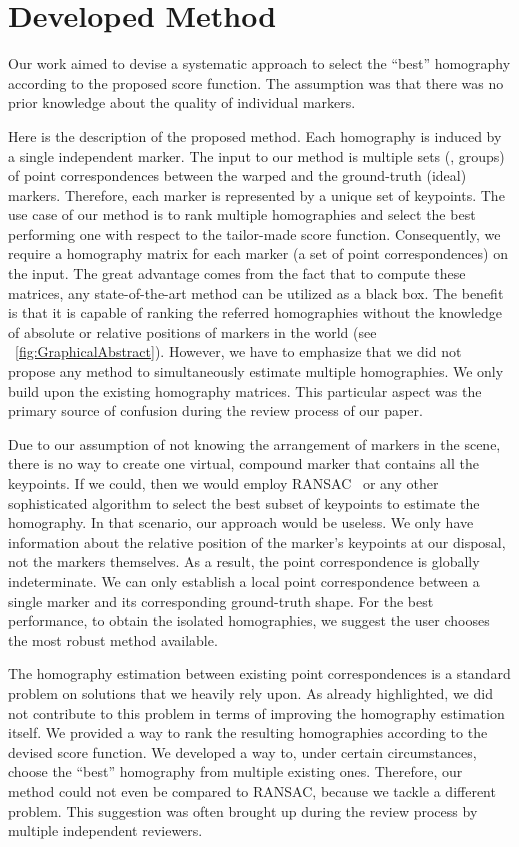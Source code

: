 \section{Developed Method}
\label{sec:HomographyDevelopedMethod}

Our work aimed to devise a systematic approach to select the ``best'' homography according to the proposed score function. The assumption was that there was no prior knowledge about the quality of individual markers.

Here is the description of the proposed method. Each homography is induced by a single independent marker. The input to our method is multiple sets (\ietext{}, groups) of point correspondences between the warped and the ground-truth (ideal) markers. Therefore, each marker is represented by a unique set of keypoints. The use case of our method is to rank multiple homographies and select the best performing one with respect to the tailor-made score function. Consequently, we require a homography matrix for each marker (a set of point correspondences) on the input. The great advantage comes from the fact that to compute these matrices, any state-of-the-art method can be utilized as a black box. The benefit is that it is capable of ranking the referred homographies without the knowledge of absolute or relative positions of markers in the world (see \figtext{}~\ref{fig:GraphicalAbstract}). However, we have to emphasize that we did not propose any method to simultaneously estimate multiple homographies. We only build upon the existing homography matrices. This particular aspect was the primary source of confusion during the review process of our paper.

Due to our assumption of not knowing the arrangement of markers in the scene, there is no way to create one virtual, compound marker that contains all the keypoints. If we could, then we would employ RANSAC~\cite{fischler1981ransac} or any other sophisticated algorithm to select the best subset of keypoints to estimate the homography. In that scenario, our approach would be useless. We only have information about the relative position of the marker’s keypoints at our disposal, not the markers themselves. As a result, the point correspondence is globally indeterminate. We can only establish a local point correspondence between a single marker and its corresponding ground-truth shape. For the best performance, to obtain the isolated homographies, we suggest the user chooses the most robust method available.

The homography estimation between existing point correspondences is a standard problem on solutions that we heavily rely upon. As already highlighted, we did not contribute to this problem in terms of improving the homography estimation itself. We provided a way to rank the resulting homographies according to the devised score function. We developed a way to,
under certain circumstances, choose the ``best'' homography from multiple existing ones. Therefore, our method could not even be compared to RANSAC, because we tackle a different problem. This suggestion was often brought up during the review process by multiple independent reviewers.

